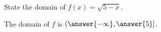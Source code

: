 \documentclass{ximera}
\author{Carl Stitz \and Jeff Zeager \and Bart Snapp \and Matthew Carr}
\begin{document}
\begin{exercise}



State the domain of $f(x)=\sqrt{5-x}$.
\begin{center}
The domain of $f$ is $(\answer{-\infty},\answer{5}]$.
\end{center}

\end{exercise}
\end{document}
